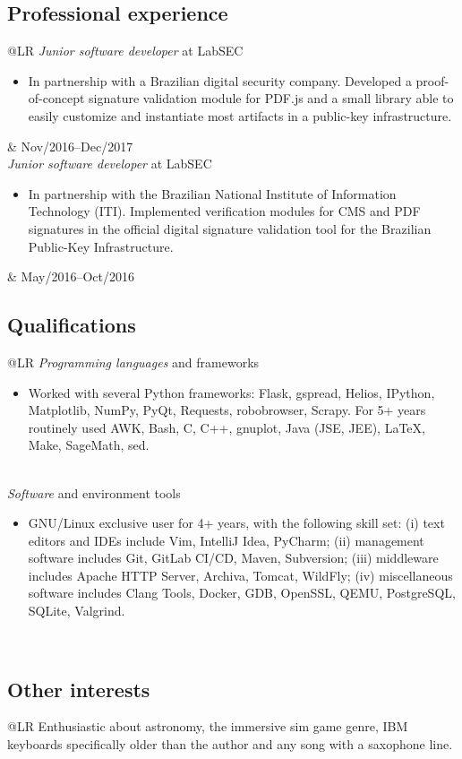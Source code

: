 \documentclass[12pt]{article}
\makeatletter
\newenvironment{datetable}
  {\newcolumntype{R}{>{\raggedleft\arraybackslash}p{0.14\textwidth}}
   \newcolumntype{L}{p{0.82\textwidth}}
   \begin{tabular}{@{\hspace{0mm}}LR}}
  {\end{tabular}}
\newenvironment{contenttable}[1]
  {\subsection*{#1}
   \begin{datetable}}
  {\end{datetable}}
\makeatother
\begin{document}
\begin{contenttable}{Professional experience}
  \textit{Junior software developer} at LabSEC
  \begin{itemize}
    \item In partnership with a Brazilian digital security company. Developed a
        proof-of-concept signature validation module for PDF.js and a small
          library able to easily customize and instantiate most artifacts in a
          public-key infrastructure.
  \end{itemize} & Nov/2016--Dec/2017 \\

  \textit{Junior software developer} at LabSEC
  \begin{itemize}
    \item In partnership with the Brazilian National Institute of Information
        Technology (ITI). Implemented verification modules for CMS and PDF
          signatures in the official digital signature validation tool for the
          Brazilian Public-Key Infrastructure.
  \end{itemize} & May/2016--Oct/2016 \\[-4mm]
\end{contenttable}

\begin{contenttable}{Qualifications}
  \textit{Programming languages} and frameworks
  \begin{itemize}
    \item Worked with several Python frameworks: Flask, gspread,
        Helios, IPython, Matplotlib, NumPy, PyQt, Requests, robobrowser,
          Scrapy. For 5+ years routinely used AWK, Bash, C, C++, gnuplot, Java
          (JSE, JEE), \LaTeX{}, Make, SageMath, sed.
  \end{itemize} \\
  \textit{Software} and environment tools
  \begin{itemize}
    \item GNU/Linux exclusive user for 4+ years, with the following skill set:
        (i) text editors and IDEs include Vim, IntelliJ Idea, PyCharm; (ii)
          management software includes Git, GitLab CI/CD, Maven, Subversion;
          (iii) middleware includes Apache HTTP Server, Archiva, Tomcat,
          WildFly; (iv) miscellaneous software includes Clang Tools, Docker,
          GDB, OpenSSL, QEMU, PostgreSQL, SQLite, Valgrind.
  \end{itemize} \\[-4mm]
\end{contenttable}

\begin{contenttable}{Other interests}
  Enthusiastic about astronomy, the immersive sim game genre, IBM keyboards
    specifically older than the author and any song with a saxophone line. \\
\end{contenttable}


\nobibliography{\jobname}
\end{document}
